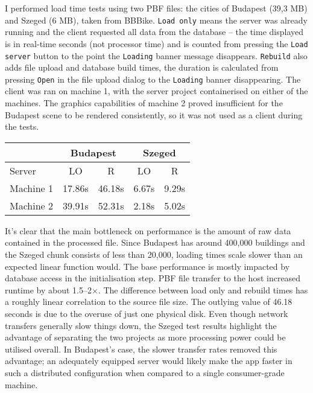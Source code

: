 I performed load time tests using two PBF files: the cities of Budapest (39,3 MB) and Szeged (6 MB), taken from BBBike. \verb|Load only| means the server was already running and the client requested all data from the database -- the time displayed is in real-time seconds (not processor time) and is counted from pressing the \verb|Load server| button to the point the \verb|Loading| banner message disappears. \verb|Rebuild| also adds file upload and database build times, the duration is calculated from pressing \verb|Open| in the file upload dialog to the \verb|Loading| banner disappearing. The client was ran on machine 1, with the server project containerised on either of the machines. The graphics capabilities of machine 2 proved insufficient for the Budapest scene to be rendered consistently, so it was not used as a client during the tests.

\begin{center}
    \begin{tabular}{l|cc|cc}
        \multicolumn{1}{c}{} & \multicolumn{2}{c}{Budapest} & \multicolumn{2}{c}{Szeged} \\
        \hline
        Server & LO & R & LO & R \\
        \hline
        Machine 1 & 17.86s & 46.18s & 6.67s & 9.29s \\
        Machine 2 & 39.91s & 52.31s & 2.18s & 5.02s \\
        \end{tabular}
\end{center}
It's clear that the main bottleneck on performance is the amount of raw data contained in the processed file. Since Budapest has around 400,000 buildings and the Szeged chunk consists of less than 20,000, loading times scale slower than an expected linear function would. The base performance is mostly impacted by database access in the initialisation step. PBF file transfer to the host increased runtime by about 1.5--2$\times$. The difference between load only and rebuild times has a roughly linear correlation to the source file size.
The outlying value of 46.18 seconds is due to the overuse of just one physical disk. Even though network transfers generally slow things down, the Szeged test results highlight the advantage of separating the two projects as more processing power could be utilised overall. In Budapest's case, the slower transfer rates removed this advantage; an adequately equipped server would likely make the app faster in such a distributed configuration when compared to a single consumer-grade machine.

